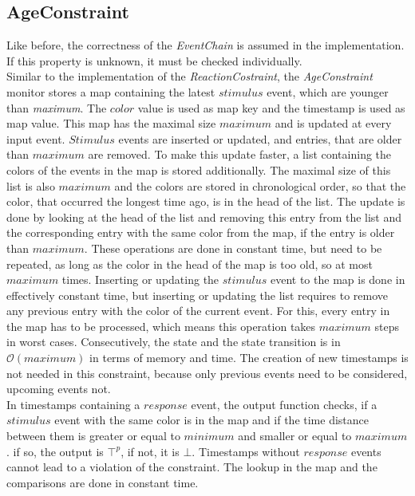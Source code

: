 \subsection{AgeConstraint}
	Like before, the correctness of the \textit{EventChain} is assumed in the implementation. If this property is unknown, it must be checked individually.\\
	Similar to the implementation of the \emph{ReactionCostraint}, the \emph{AgeConstraint} monitor stores a map containing the latest $stimulus$ event, which are younger than \textit{maximum}. The $color$ value is used as map key and the timestamp is used as map value. This map has the maximal size $maximum$ and is updated at every input event. $Stimulus$ events are inserted or updated, and entries, that are older than $maximum$ are removed. To make this update faster, a list containing the colors of the events in the map is stored additionally. The maximal size of this list is also $maximum$ and the colors are stored in chronological order, so that the color, that occurred the longest time ago, is in the head of the list. The update is done by looking at the head of the list and removing this entry from the list and the corresponding entry with the same color from the map, if the entry is older than $maximum$. These operations are done in constant time, but need to be repeated, as long as the color in the head of the map is too old, so at most $maximum$ times. Inserting or updating the $stimulus$ event to the map is done in effectively constant time, but inserting or updating the list requires to remove any previous entry with the color of the current event. For this, every entry in the map has to be processed, which means this operation takes $maximum$ steps in worst cases. Consecutively, the state and the state transition is in $\mathcal{O}(maximum)$ in terms of memory and time. The creation of new timestamps is not needed in this constraint, because only previous events need to be considered, upcoming events not.\\
	In timestamps containing a $response$ event, the output function checks, if a $stimulus$ event with the same color is in the map and if the time distance between them is greater or equal to $minimum$ and smaller or equal to $maximum$. if so, the output is $\top^p$, if not, it is $\bot$. Timestamps without $response$ events cannot lead to a violation of the constraint. The lookup in the map and the comparisons are done in constant time.

